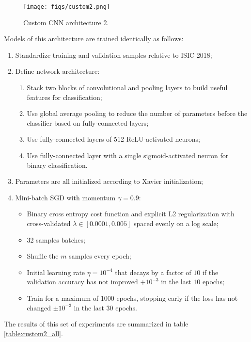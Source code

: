 \begin{figure}[ht]
    \centering
    \texttt{[image: figs/custom2.png]}
    \caption{Custom \ac{CNN} architecture 2.}
    \label{fig:custom2}
\end{figure}

Models of this architecture are trained identically as follows:

\begin{enumerate}
    \item Standardize training and validation samples relative to \ac{ISIC} 2018;
    \item Define network architecture:
        \begin{enumerate}
            \item Stack two blocks of convolutional and pooling layers to build useful features for classification;
            \item Use global average pooling to reduce the number of parameters before the classifier based on fully-connected layers;
            \item Use fully-connected layers of 512 ReLU-activated neurons;
            \item Use fully-connected layer with a single sigmoid-activated neuron for binary classification.
        \end{enumerate}
    \item Parameters are all initialized according to Xavier \cite{xavierinit} initialization;
    \item Mini-batch \ac{SGD} with momentum $\gamma = 0.9$:
        \begin{itemize}
            \item Binary cross entropy cost function and explicit L2 regularization with cross-validated $\lambda \in [0.0001, 0.005]$ spaced evenly on a log scale;
            \item 32 samples batches;
            \item Shuffle the $m$ samples every epoch;
            \item Initial learning rate $\eta = 10^{-4}$ that decays by a factor of $10$ if the validation accuracy has not improved $+10^{-3}$ in the last $10$ epochs;
            \item Train for a maximum of 1000 epochs, stopping early if the loss has not changed $\pm 10^{-3}$ in the last $30$ epochs.
        \end{itemize}
\end{enumerate}

The results of this set of experiments are summarized in table \ref{table:custom2_all}.

